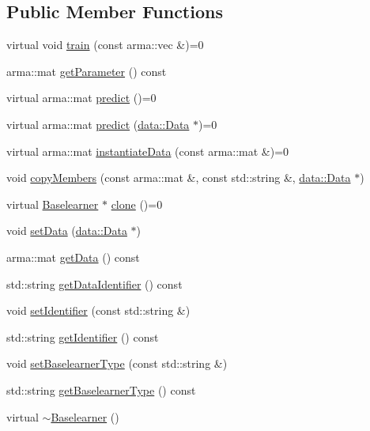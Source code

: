 \subsection*{Public Member Functions}
\begin{DoxyCompactItemize}
\item 
virtual void \mbox{\hyperlink{classblearner_1_1_baselearner_a40e03ad070b9a03aae706d9ee8094b80}{train}} (const arma\+::vec \&)=0
\item 
arma\+::mat \mbox{\hyperlink{classblearner_1_1_baselearner_a3362fe72e1b653ec3664cae2397414ed}{get\+Parameter}} () const
\item 
virtual arma\+::mat \mbox{\hyperlink{classblearner_1_1_baselearner_ab37986047db43c84420fef2cef7fc20d}{predict}} ()=0
\item 
virtual arma\+::mat \mbox{\hyperlink{classblearner_1_1_baselearner_ae2ef5e018783578e02b3b5a33fa94eae}{predict}} (\mbox{\hyperlink{classdata_1_1_data}{data\+::\+Data}} $\ast$)=0
\item 
virtual arma\+::mat \mbox{\hyperlink{classblearner_1_1_baselearner_af01f1b8c4540927705ff79c3649489f7}{instantiate\+Data}} (const arma\+::mat \&)=0
\item 
void \mbox{\hyperlink{classblearner_1_1_baselearner_ae8f114ca7c497f03c80de5981c7f811d}{copy\+Members}} (const arma\+::mat \&, const std\+::string \&, \mbox{\hyperlink{classdata_1_1_data}{data\+::\+Data}} $\ast$)
\item 
virtual \mbox{\hyperlink{classblearner_1_1_baselearner}{Baselearner}} $\ast$ \mbox{\hyperlink{classblearner_1_1_baselearner_a8e12c6739f085917a7d2da6570c51a21}{clone}} ()=0
\item 
void \mbox{\hyperlink{classblearner_1_1_baselearner_a29122c6125ef6ec03ad84602b3e2d0d4}{set\+Data}} (\mbox{\hyperlink{classdata_1_1_data}{data\+::\+Data}} $\ast$)
\item 
arma\+::mat \mbox{\hyperlink{classblearner_1_1_baselearner_af3a360bb039447610e9928956384c05d}{get\+Data}} () const
\item 
std\+::string \mbox{\hyperlink{classblearner_1_1_baselearner_a2393dc1e3cf90919ebbbd237fe303860}{get\+Data\+Identifier}} () const
\item 
void \mbox{\hyperlink{classblearner_1_1_baselearner_a6669906a481cbdd516dce8df6f6e5b76}{set\+Identifier}} (const std\+::string \&)
\item 
std\+::string \mbox{\hyperlink{classblearner_1_1_baselearner_aa10fa4301aeb37f6e8c18457541c3be7}{get\+Identifier}} () const
\item 
void \mbox{\hyperlink{classblearner_1_1_baselearner_a8d78e851bae5f5b93dc46eb13d2d1ee1}{set\+Baselearner\+Type}} (const std\+::string \&)
\item 
std\+::string \mbox{\hyperlink{classblearner_1_1_baselearner_acec1a791f94eed39d2662c245e7f6b51}{get\+Baselearner\+Type}} () const
\item 
virtual \mbox{\hyperlink{classblearner_1_1_baselearner_a1ada1c47d71e60bec80ab033ffa40813}{$\sim$\+Baselearner}} ()
\end{DoxyCompactItemize}
